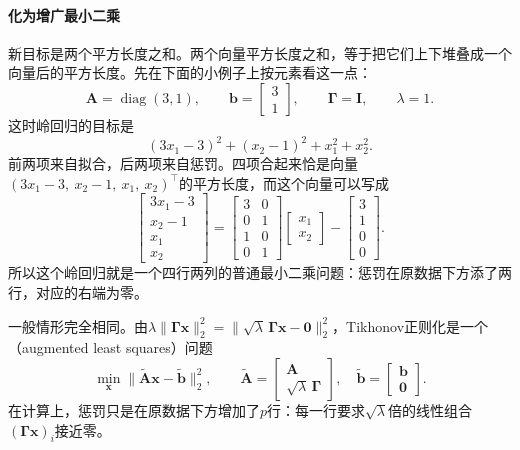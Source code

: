 \paragraph{化为增广最小二乘}
新目标是两个平方长度之和。两个向量平方长度之和，等于把它们上下堆叠成一个向量后的平方长度。先在下面的小例子上按元素看这一点：
\[
 \bm A=\operatorname{diag}(3,1),\qquad \bm b=\begin{bmatrix}3\\1\end{bmatrix},\qquad \bm\Gamma=\bm I,\qquad \lambda=1 .
\]
这时岭回归的目标是
\[
 (3x_1-3)^2+(x_2-1)^2+x_1^2+x_2^2 .
\]
前两项来自拟合，后两项来自惩罚。四项合起来恰是向量$(3x_1-3,\ x_2-1,\ x_1,\ x_2)^\top$的平方长度，而这个向量可以写成
\[
 \begin{bmatrix}3x_1-3\\x_2-1\\x_1\\x_2\end{bmatrix}
 =\begin{bmatrix}3&0\\0&1\\1&0\\0&1\end{bmatrix}\begin{bmatrix}x_1\\x_2\end{bmatrix}
 -\begin{bmatrix}3\\1\\0\\0\end{bmatrix}.
\]
所以这个岭回归就是一个四行两列的普通最小二乘问题：惩罚在原数据下方添了两行，对应的右端为零。

一般情形完全相同。由$\lambda\lVert\bm\Gamma\bm x\rVert_2^2=\lVert\sqrt\lambda\,\bm\Gamma\bm x-\bm0\rVert_2^2$，Tikhonov正则化是一个（augmented least squares）问题
\begin{equation}
 \min_{\bm x}\lVert\tilde{\bm A}\bm x-\tilde{\bm b}\rVert_2^2,\qquad
 \tilde{\bm A}=\begin{bmatrix}\bm A\\ \sqrt\lambda\,\bm\Gamma\end{bmatrix},\quad
 \tilde{\bm b}=\begin{bmatrix}\bm b\\ \bm0\end{bmatrix}.
 \label{eq:ls-augmented-system}
\end{equation}
在计算上，惩罚只是在原数据下方增加了$p$行：每一行要求$\sqrt\lambda$倍的线性组合$(\bm\Gamma\bm x)_i$接近零。

